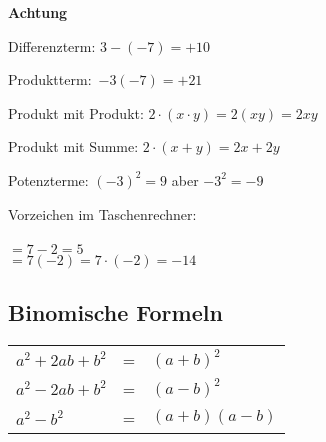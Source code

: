 \begin{multicols}{2}
\textbf{Achtung}

Differenzterm:  $3-(-7) = +10$

Produktterm:\, $-3(-7) = +21$

Produkt mit Produkt: $2\cdot(x\cdot{}y) = 2(xy) = 2xy$

Produkt mit Summe: $2\cdot(x+y)=2x+2y$

Potenzterme: $(-3)^2 = 9$ aber $-3^2 = -9$

\headerUndFooterDieseSeite{}

Vorzeichen im Taschenrechner:\\
\vspace{3mm}\\
$=7-2= 5$\\
$=7(-2)=7\cdot{}(-2)= -14$








\subsection*{Binomische Formeln}
\begin{tabular}{lcl}
  $a^2 + 2ab + b^2$  & =  &  $(a+b)^2$\\
  $a^2 - 2ab + b^2$  & =  &  $(a-b)^2$\\
  $a^2 - b^2$        & =  &  $(a+b)(a-b)$
\end{tabular} 



\end{multicols}
